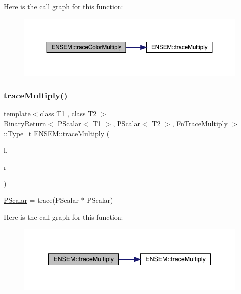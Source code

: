 Here is the call graph for this function\+:\nopagebreak
\begin{figure}[H]
\begin{center}
\leavevmode
\includegraphics[width=350pt]{db/dcc/group__primscalar_ga7d0ad8d52e28a6e277de161b427932eb_cgraph}
\end{center}
\end{figure}
\mbox{\label{group__primscalar_gafbab702f52c534882636a524d002b106}} 
\subsubsection{\texorpdfstring{traceMultiply()}{traceMultiply()}}
{\footnotesize\ttfamily template$<$class T1 , class T2 $>$ \\
\mbox{\hyperlink{structENSEM_1_1BinaryReturn}{Binary\+Return}}$<$ \mbox{\hyperlink{classENSEM_1_1PScalar}{P\+Scalar}}$<$ T1 $>$, \mbox{\hyperlink{classENSEM_1_1PScalar}{P\+Scalar}}$<$ T2 $>$, \mbox{\hyperlink{structENSEM_1_1FnTraceMultiply}{Fn\+Trace\+Multiply}} $>$\+::Type\+\_\+t E\+N\+S\+E\+M\+::trace\+Multiply (\begin{DoxyParamCaption}\item[{const \mbox{\hyperlink{classENSEM_1_1PScalar}{P\+Scalar}}$<$ T1 $>$ \&}]{l,  }\item[{const \mbox{\hyperlink{classENSEM_1_1PScalar}{P\+Scalar}}$<$ T2 $>$ \&}]{r }\end{DoxyParamCaption})\hspace{0.3cm}{\ttfamily [inline]}}



\mbox{\hyperlink{classENSEM_1_1PScalar}{P\+Scalar}} = trace(\+P\+Scalar $\ast$ P\+Scalar) 

Here is the call graph for this function\+:\nopagebreak
\begin{figure}[H]
\begin{center}
\leavevmode
\includegraphics[width=342pt]{db/dcc/group__primscalar_gafbab702f52c534882636a524d002b106_cgraph}
\end{center}
\end{figure}
\mbox{\label{group__primscalar_gacb9de2d99f632eb0d424014a2afbdef7}} 
